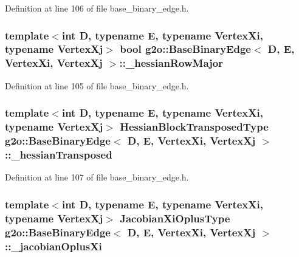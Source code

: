 Definition at line 106 of file base\+\_\+binary\+\_\+edge.\+h.

\subsubsection[{\texorpdfstring{\+\_\+hessian\+Row\+Major}{_hessianRowMajor}}]{\setlength{\rightskip}{0pt plus 5cm}template$<$int D, typename E, typename Vertex\+Xi, typename Vertex\+Xj$>$ bool {\bf g2o\+::\+Base\+Binary\+Edge}$<$ D, E, Vertex\+Xi, Vertex\+Xj $>$\+::\+\_\+hessian\+Row\+Major\hspace{0.3cm}{\ttfamily [protected]}}\hypertarget{classg2o_1_1BaseBinaryEdge_aeb5c1f09a4433a6bd76ce4ab67bd9a64}{}\label{classg2o_1_1BaseBinaryEdge_aeb5c1f09a4433a6bd76ce4ab67bd9a64}


Definition at line 105 of file base\+\_\+binary\+\_\+edge.\+h.

\subsubsection[{\texorpdfstring{\+\_\+hessian\+Transposed}{_hessianTransposed}}]{\setlength{\rightskip}{0pt plus 5cm}template$<$int D, typename E, typename Vertex\+Xi, typename Vertex\+Xj$>$ {\bf Hessian\+Block\+Transposed\+Type} {\bf g2o\+::\+Base\+Binary\+Edge}$<$ D, E, Vertex\+Xi, Vertex\+Xj $>$\+::\+\_\+hessian\+Transposed\hspace{0.3cm}{\ttfamily [protected]}}\hypertarget{classg2o_1_1BaseBinaryEdge_aa61657904b00fcfa19df382094386f11}{}\label{classg2o_1_1BaseBinaryEdge_aa61657904b00fcfa19df382094386f11}


Definition at line 107 of file base\+\_\+binary\+\_\+edge.\+h.

\subsubsection[{\texorpdfstring{\+\_\+jacobian\+Oplus\+Xi}{_jacobianOplusXi}}]{\setlength{\rightskip}{0pt plus 5cm}template$<$int D, typename E, typename Vertex\+Xi, typename Vertex\+Xj$>$ {\bf Jacobian\+Xi\+Oplus\+Type} {\bf g2o\+::\+Base\+Binary\+Edge}$<$ D, E, Vertex\+Xi, Vertex\+Xj $>$\+::\+\_\+jacobian\+Oplus\+Xi\hspace{0.3cm}{\ttfamily [protected]}}\hypertarget{classg2o_1_1BaseBinaryEdge_aa21b9d84924ec93192374761ee0adfa7}{}\label{classg2o_1_1BaseBinaryEdge_aa21b9d84924ec93192374761ee0adfa7}


